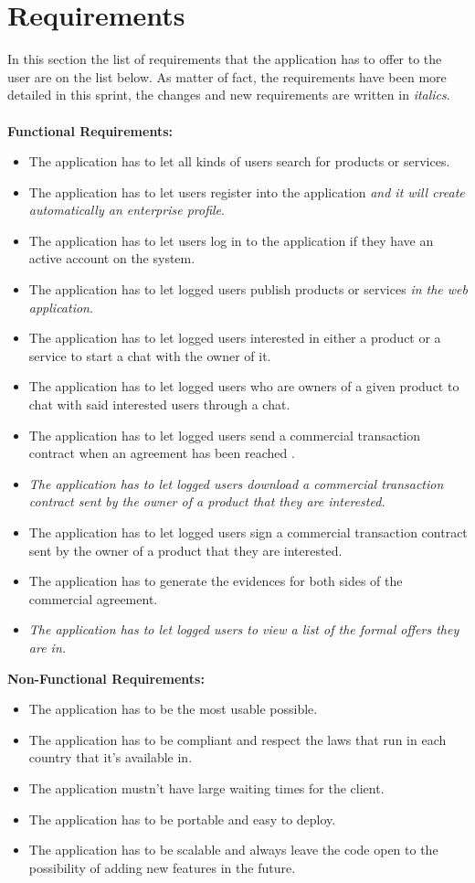 \documentclass[./main.tex]{subfiles}
\begin{document}
\section{Requirements}
In this section the list of requirements that the application has to offer to the user are on the list below. As matter of fact, the requirements have been more detailed in this sprint, the changes and new requirements are written in \textit{italics}.
\\\\
\textbf{Functional Requirements:}
\begin{itemize}
	
	\item
	The application has to let all kinds of users search for products or
	services.
	\item
	The application has to let users register into the application \textit{and it will create automatically an enterprise profile}.
	\item
	The application has to let users log in to the application if they
	have an active account on the system.
	\item
	The application has to let logged users publish products or services \textit{in the web application}.
	\item
	The application has to let logged users interested in either a product
	or a service to start a chat with the owner of it.
	\item
	The application has to let logged users who are owners of a given
	product to chat with said interested users through a chat.
	\item
	The application has to let logged users send a commercial transaction
	contract when an agreement has been reached .
	\item 
	\textit{The application has to let logged users download a commercial transaction
	contract sent by the owner of a product that they are interested.}
	\item
	The application has to let logged users sign a commercial transaction
	contract sent by the owner of a product that they are interested.
	\item
	The application has to generate the evidences for both sides of the
	commercial agreement.
	\item \textit{The application has to let logged users to view a list of the formal offers they are in.}
\end{itemize}
\textbf{Non-Functional Requirements:}
\begin{itemize}
	
	\item
	The application has to be the most usable possible.
	\item
	The application has to be compliant and respect the laws that run in
	each country that it's available in.
	\item
	The application mustn't have large waiting times for the client.
	\item
	The application has to be portable and easy to deploy.
	\item
	The application has to be scalable and always leave the code open to
	the possibility of adding new features in the future.
\end{itemize}
\end{document}
